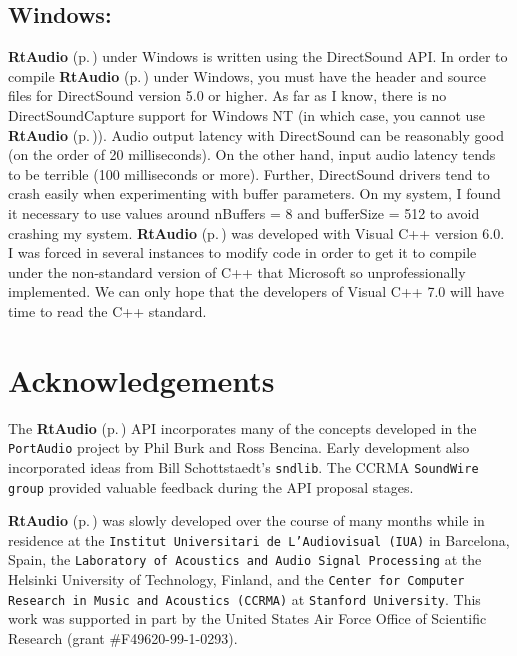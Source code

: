 \subsection{Windows:}\label{windows}


{\bf Rt\-Audio} {\rm (p.\,\pageref{classRtAudio})} under Windows is written using the Direct\-Sound API. In order to compile {\bf Rt\-Audio} {\rm (p.\,\pageref{classRtAudio})} under Windows, you must have the header and source files for Direct\-Sound version 5.0 or higher. As far as I know, there is no Direct\-Sound\-Capture support for Windows NT (in which case, you cannot use {\bf Rt\-Audio} {\rm (p.\,\pageref{classRtAudio})}). Audio output latency with Direct\-Sound can be reasonably good (on the order of 20 milliseconds). On the other hand, input audio latency tends to be terrible (100 milliseconds or more). Further, Direct\-Sound drivers tend to crash easily when experimenting with buffer parameters. On my system, I found it necessary to use values around n\-Buffers = 8 and buffer\-Size = 512 to avoid crashing my system. {\bf Rt\-Audio} {\rm (p.\,\pageref{classRtAudio})} was developed with Visual C++ version 6.0. I was forced in several instances to modify code in order to get it to compile under the non-standard version of C++ that Microsoft so unprofessionally implemented. We can only hope that the developers of Visual C++ 7.0 will have time to read the C++ standard.

\section{Acknowledgements}\label{acknowledge}


The {\bf Rt\-Audio} {\rm (p.\,\pageref{classRtAudio})} API incorporates many of the concepts developed in the {\tt Port\-Audio} project by Phil Burk and Ross Bencina. Early development also incorporated ideas from Bill Schottstaedt's {\tt sndlib}. The CCRMA {\tt Sound\-Wire group} provided valuable feedback during the API proposal stages.

{\bf Rt\-Audio} {\rm (p.\,\pageref{classRtAudio})} was slowly developed over the course of many months while in residence at the {\tt Institut Universitari de L'Audiovisual (IUA)} in Barcelona, Spain, the {\tt Laboratory of Acoustics and Audio Signal Processing} at the Helsinki University of Technology, Finland, and the {\tt Center for Computer Research in Music and Acoustics (CCRMA)} at {\tt Stanford University}. This work was supported in part by the United States Air Force Office of Scientific Research (grant \#F49620-99-1-0293).

